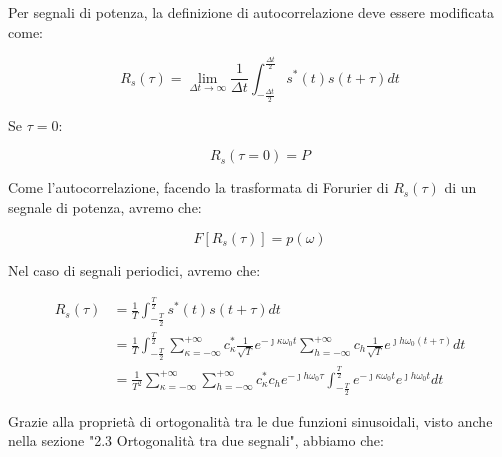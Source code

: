 Per segnali di potenza, la definizione di autocorrelazione deve essere modificata come: 

{
    \Large 
    \begin{equation}
        R_s (\tau) = \lim_{\Delta t \rightarrow \infty} 
        \frac{1}{\Delta t} 
        \int_{- \frac{\Delta t}{2}}^{\frac{\Delta t}{2}}
        s^{*} (t) s(t + \tau) dt
    \end{equation}
}

Se $\tau = 0$: 

{
    \Large 
    \begin{equation}
        R_s (\tau = 0) = P
    \end{equation}
}

Come l'autocorrelazione, facendo la trasformata di Forurier di $R_s (\tau)$ 
di un segnale di potenza, avremo che: 

{
    \Large 
    \begin{equation}
        F[R_s (\tau)] = p(\omega)
    \end{equation}
}

Nel caso di segnali periodici, avremo che: 

{
    \Large 
    \begin{equation}
        \begin{split}
            R_s (\tau) 
            &=
            \frac{1}{T} 
            \int_{- \frac{T}{2}}^{\frac{T}{2}} 
            s^{*} (t) s(t + \tau) dt 
            \\ 
            &= \frac{1}{T} 
            \int_{- \frac{T}{2}}^{\frac{T}{2}}
            \sum_{\kappa = - \infty}^{+\infty}
            c_\kappa ^{*} \frac{1}{\sqrt{T}} 
            e^{- \jmath \kappa \omega_0 t}
            \sum_{h = - \infty}^{+\infty}
            c_h \frac{1}{\sqrt{T}} 
            e^{\jmath h \omega_0 (t + \tau)} 
            dt 
            \\ 
            &= 
            \frac{1}{T^{2}} 
            \sum_{\kappa = - \infty}^{+\infty} 
            \sum_{h = - \infty}^{+\infty} 
            c_\kappa ^{*} c_h 
            e^{-\jmath h \omega_0 \tau}
            \int_{-\frac{T}{2}}^{\frac{T}{2}} 
            e^{-\jmath \kappa \omega_0 t} 
            e^{\jmath h \omega_0 t} 
            dt
        \end{split}
    \end{equation}
} 

Grazie alla proprietà di ortogonalità tra le due funzioni sinusoidali, 
visto anche nella sezione "2.3 Ortogonalità tra due segnali", abbiamo che: 

